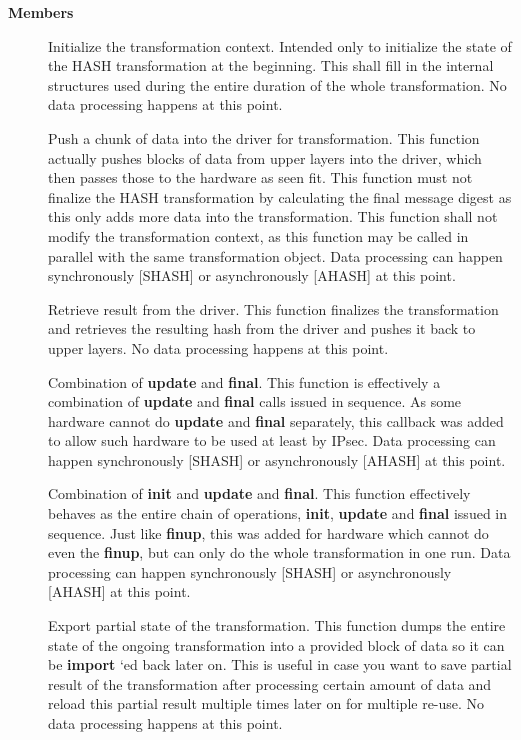 \documentclass[a4paper,8pt,english]{sphinxmanual}
\begin{document}
\textbf{Members}
\begin{description}
\item[{}] \leavevmode
Initialize the transformation context. Intended only to initialize the
state of the HASH transformation at the beginning. This shall fill in
the internal structures used during the entire duration of the whole
transformation. No data processing happens at this point.

\item[{}] \leavevmode
Push a chunk of data into the driver for transformation. This
function actually pushes blocks of data from upper layers into the
driver, which then passes those to the hardware as seen fit. This
function must not finalize the HASH transformation by calculating the
final message digest as this only adds more data into the
transformation. This function shall not modify the transformation
context, as this function may be called in parallel with the same
transformation object. Data processing can happen synchronously
{[}SHASH{]} or asynchronously {[}AHASH{]} at this point.

\item[{}] \leavevmode
Retrieve result from the driver. This function finalizes the
transformation and retrieves the resulting hash from the driver and
pushes it back to upper layers. No data processing happens at this
point.

\item[{}] \leavevmode
Combination of \textbf{update} and \textbf{final}. This function is effectively a
combination of \textbf{update} and \textbf{final} calls issued in sequence. As some
hardware cannot do \textbf{update} and \textbf{final} separately, this callback was
added to allow such hardware to be used at least by IPsec. Data
processing can happen synchronously {[}SHASH{]} or asynchronously {[}AHASH{]}
at this point.

\item[{}] \leavevmode
Combination of \textbf{init} and \textbf{update} and \textbf{final}. This function
effectively behaves as the entire chain of operations, \textbf{init},
\textbf{update} and \textbf{final} issued in sequence. Just like \textbf{finup}, this was
added for hardware which cannot do even the \textbf{finup}, but can only do
the whole transformation in one run. Data processing can happen
synchronously {[}SHASH{]} or asynchronously {[}AHASH{]} at this point.

\item[{}] \leavevmode
Export partial state of the transformation. This function dumps the
entire state of the ongoing transformation into a provided block of
data so it can be \textbf{import} `ed back later on. This is useful in case
you want to save partial result of the transformation after
processing certain amount of data and reload this partial result
multiple times later on for multiple re-use. No data processing
happens at this point.


\end{description}
\end{document}
